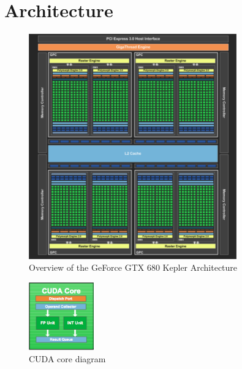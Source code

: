 \documentclass[../thesis]{subfiles}
\begin{document}
	\section{Architecture}
	\label{sec:cuda:arch}

	\begin{figure}[!htp]
		\centering
		\includegraphics[width=0.8\textwidth]{assets/images/cuda/arch/gtx680.png}
		\caption[Overview of the GeForce GTX 680 Kepler Architecture]{Overview of the GeForce GTX 680 Kepler Architecture \cite{NVIDIA:GTX680}}
		\label{fig:gtx680}
	\end{figure}
	
	\begin{figure}
		\centering
		\includegraphics[width=0.25\textwidth]{assets/images/cuda/arch/cuda-core.png}
		\caption{CUDA core diagram}
		\label{fig:cudacore}
	\end{figure}
\end{document}
